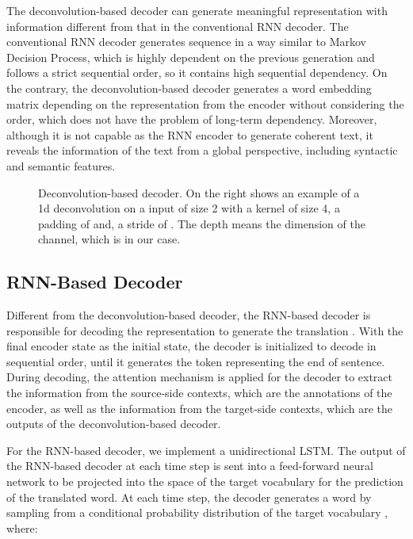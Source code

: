 \documentclass[11pt]{article}
\begin{document}
\begin{CJK}{UTF8}{gbsn}
The deconvolution-based decoder can generate meaningful representation with information different from that in the conventional RNN decoder. The conventional RNN decoder generates sequence in a way similar to Markov Decision Process, which is highly dependent on the previous generation and follows a strict sequential order, so it contains high sequential dependency. On the contrary, the deconvolution-based decoder generates a word embedding matrix depending on the representation from the encoder without considering the order, which does not have the problem of long-term dependency. Moreover, although it is not capable as the RNN encoder to generate coherent text, it reveals the information of the text from a global perspective, including syntactic and semantic features.

\begin{figure*}[t]
\centering
{} \hspace{1cm}
\caption{Deconvolution-based decoder. On the right shows an example of a 1d deconvolution on a input of size 2 with a kernel of size 4, a padding of  and, a stride of . The depth means the dimension of the channel, which is  in our case.}
\end{figure*}

\subsection{RNN-Based Decoder}
Different from the deconvolution-based decoder, the RNN-based decoder is responsible for decoding the representation  to generate the translation . With the final encoder state as the initial state, the decoder is initialized to decode in sequential order, until it generates the token representing the end of sentence. During decoding, the attention mechanism is applied for the decoder to extract the information from the source-side contexts, which are the annotations of the encoder, as well as the information from the target-side contexts, which are the outputs of the deconvolution-based decoder.

For the RNN-based decoder, we implement a unidirectional LSTM. The output of the RNN-based decoder at each time step is sent into a feed-forward neural network to be projected into the space of the target vocabulary  for the prediction of the translated word. At each time step, the decoder generates a word  by sampling from a conditional probability distribution of the target vocabulary , where: 


\end{CJK}
\end{document}
